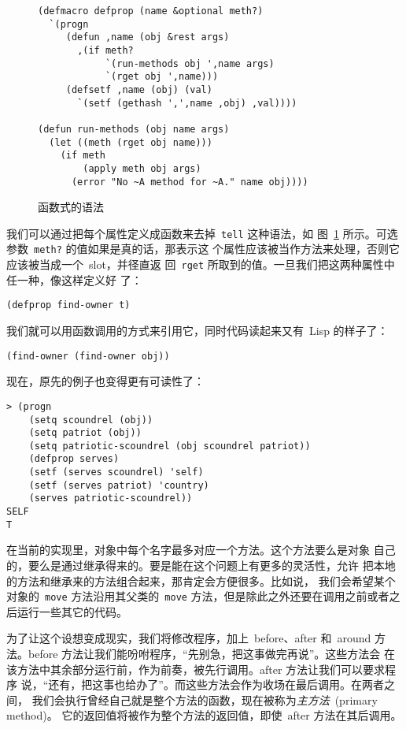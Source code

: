 \begin{figure}
\begin{lstlisting}
(defmacro defprop (name &optional meth?)
  `(progn
     (defun ,name (obj &rest args)
       ,(if meth?
            `(run-methods obj ',name args)
            `(rget obj ',name)))
     (defsetf ,name (obj) (val)
       `(setf (gethash ',',name ,obj) ,val))))

(defun run-methods (obj name args)
  (let ((meth (rget obj name)))
    (if meth
        (apply meth obj args)
      (error "No ~A method for ~A." name obj))))
\end{lstlisting}
\caption{\label{fig:functinoal_syntax}函数式的语法}
\end{figure}
我们可以通过把每个属性定义成函数来去掉~\texttt{tell} 这种语法，如
图~\ref{fig:functinoal_syntax} 所示。可选参数~\texttt{meth?} 的值如果是真的话，那表示这
个属性应该被当作方法来处理，否则它应该被当成一个~slot，并径直返
回~\texttt{rget} 所取到的值。一旦我们把这两种属性中任一种，像这样定义好
了：
\begin{lstlisting}
(defprop find-owner t)
\end{lstlisting}
我们就可以用函数调用的方式来引用它，同时代码读起来又有~Lisp 的样子了：
\begin{lstlisting}
(find-owner (find-owner obj))
\end{lstlisting}
现在，原先的例子也变得更有可读性了：
\begin{lstlisting}
> (progn
    (setq scoundrel (obj))
    (setq patriot (obj))
    (setq patriotic-scoundrel (obj scoundrel patriot))
    (defprop serves)
    (setf (serves scoundrel) 'self)
    (setf (serves patriot) 'country)
    (serves patriotic-scoundrel))
SELF
T
\end{lstlisting}

在当前的实现里，对象中每个名字最多对应一个方法。这个方法要么是对象
自己的，要么是通过继承得来的。要是能在这个问题上有更多的灵活性，允许
把本地的方法和继承来的方法组合起来，那肯定会方便很多。比如说，
我们会希望某个对象的~\texttt{move} 方法沿用其父类的~\texttt{move} 
方法，但是除此之外还要在调用之前或者之后运行一些其它的代码。

为了让这个设想变成现实，我们将修改程序，加上~before、after 和~around 方
法。before 方法让我们能吩咐程序，``先别急，把这事做完再说''。这些方法会
在该方法中其余部分运行前，作为前奏，被先行调用。after 方法让我们可以要求程序
说，``还有，把这事也给办了''。而这些方法会作为收场在最后调用。在两者之间，
我们会执行曾经自己就是整个方法的函数，现在被称为\emph{主方法}~(primary method)。
它的返回值将被作为整个方法的返回值，即使~after 方法在其后调用。

